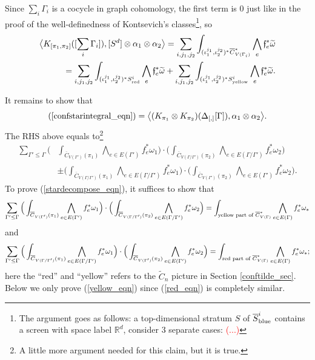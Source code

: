 \documentclass[11pt]{article}
\theoremstyle{definition}
\theoremstyle{remark}
\def\wt#1{\widetilde{#1}}
\def\ov#1{\overline{#1}}
\def\sred{{\textnormal{red}}}
\def\syellow{{\textnormal{yellow}}}
\def\sblue{{\textnormal{blue}}}
\def\R{\mathbb{R}}
\def\ff{\mathfrak{f}}
\def\cmt#1{\textcolor{red}{(#1)}}
\def\tn#1{\textnormal{#1}}
\begin{document}
Since $\sum_{i}\Gamma_i$ is a cocycle in graph cohomology, the first term is 0 just like in the proof of the well-definedness of Kontsevich's classes\footnote{
The argument goes as follows: a top-dimensional stratum $S$ of $\ov{S}_{\sblue}^i$ contains a screen with space label $\R^d$, consider 3 separate cases: \cmt{...}
}, 
so
\begin{align}\label{confstarintegral_eqn}
\big\langle K_{[\pi_1,\pi_2]}([\sum_i\Gamma_i]), [S^d]\otimes\alpha_1\otimes\alpha_2 \big\rangle=
\sum_{i,j_1,j_2}\int_{(\iota_1^{j_1},\iota_2^{j_2})^*\ov{C}^*_{V(\Gamma_i)}}\bigwedge_{e}\ff_e^*{\wt\omega}\nonumber\\
=
\sum_{i,j_1,j_2}\int_{(\iota_1^{j_1},\iota_2^{j_2})^*{S}_{\sred}^i}\bigwedge_{e}\ff_e^*{\wt\omega}+
\sum_{i,j_1,j_2}\int_{(\iota_1^{j_1},\iota_2^{j_2})^*{S}_{\syellow}^i}\bigwedge_{e}\ff_e^*{\wt\omega}.
\end{align}



It remains to show that 
\begin{equation}\label{stardecompose_eqn}
(\ref{confstarintegral_eqn})=\big\langle (K_{\pi_1}\otimes K_{\pi_2})(\Delta_{[,]}[\Gamma]), \alpha_1\otimes\alpha_2 \big\rangle. 
\end{equation}
The RHS above equals to\footnote{
A little more argument needed for this claim, but it is true.} 
\begin{align*}
\sum_{\Gamma'\le\Gamma}
\Big(&\int_{\ov{C}_{V(\Gamma')}(\pi_1)}
\bigwedge_{e\in E(\Gamma')}f_e^*\omega_1\Big)
\cdot
\Big(\int_{\ov{C}_{V(\Gamma/\Gamma')}(\pi_2)}
\bigwedge_{e\in E(\Gamma/\Gamma')}f_e^*\omega_2\Big)\\
&\pm
\Big(\int_{\ov{C}_{V(\Gamma/\Gamma')}(\pi_1)}
\bigwedge_{e\in E(\Gamma/\Gamma')}f_e^*\omega_1\Big)
\cdot
\Big(\int_{\ov{C}_{V(\Gamma')}(\pi_2)}
\bigwedge_{e\in E(\Gamma')}f_e^*\omega_2\Big).
\end{align*}
To prove (\ref{stardecompose_eqn}), it suffices to show that 
\begin{equation}\label{yellow_eqn}
\sum_{\Gamma'\le\Gamma}
\Big(\int_{\ov{C}_{V(\Gamma')}(\pi_1)}
\bigwedge_{e\in E(\Gamma')}f_e^*\omega_1\Big)
\cdot
\Big(\int_{\ov{C}_{V(\Gamma/\Gamma')}(\pi_2)}
\bigwedge_{e\in E(\Gamma/\Gamma')}f_e^*\omega_2\Big)=
\int_{\tn{yellow part of }\ov{C}^*_{V(\Gamma)}}\bigwedge_{e\in E(\Gamma)}f_e^*{\omega_*}
\end{equation}
and 
\begin{equation}\label{red_eqn}
\sum_{\Gamma'\le\Gamma}
\Big(\int_{\ov{C}_{V(\Gamma/\Gamma')}(\pi_1)}
\bigwedge_{e\in E(\Gamma/\Gamma')}f_e^*\omega_1\Big)
\cdot
\Big(\int_{\ov{C}_{V(\Gamma')}(\pi_2)}
\bigwedge_{e\in E(\Gamma')}f_e^*\omega_2\Big)=
\int_{\tn{red part of }\ov{C}^*_{V(\Gamma)}}\bigwedge_{e\in E(\Gamma)}f_e^*{\omega_*};
\end{equation}
here the ``red'' and ``yellow'' refers to the $\wt{C}_n$ picture in Section \ref{conftilde_sec}. 
Below we only prove (\ref{yellow_eqn}) since (\ref{red_eqn}) is completely similar. 
\end{document}
